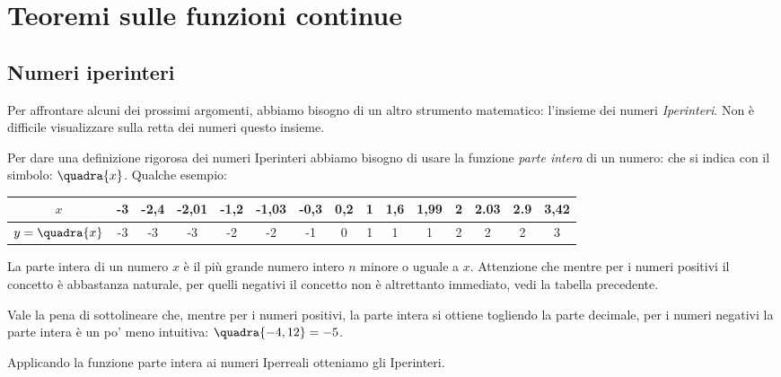 


\chapter{Teoremi sulle funzioni continue}

\section{Numeri iperinteri}
\label{subsec:cont_iperinteri}

Per affrontare alcuni dei prossimi argomenti, abbiamo bisogno di un altro 
strumento matematico: l'insieme dei numeri \emph{Iperinteri}.
Non è difficile visualizzare sulla retta dei numeri questo insieme.

Per dare una definizione rigorosa dei numeri Iperinteri abbiamo bisogno di 
usare la funzione \emph{parte intera} di un numero: che si indica con il 
simbolo:
\(\quadra{x}\). Qualche esempio:
\begin{center}
\begin{tabular}{ccccccccccccccc}
\(x\) & 
-3&-2,4&-2,01&-1,2&-1,03&-0,3&0,2&1&1,6&1,99&2&2.03&2.9&3,42\\
\hline
\(y=\quadra{x}\) & 
-3&-3  &-3   &-2  &-2   &-1  &0  &1&1  &1   &2&2   &2  &3
\end{tabular}
\end{center}

\begin{minipage}{.59\textwidth}
La parte intera di un numero \(x\) è il più grande numero intero \(n\) 
minore o uguale a \(x\). Attenzione che mentre per i numeri positivi il 
concetto è abbastanza naturale, per quelli negativi il concetto non è 
altrettanto immediato, vedi la tabella precedente.

Vale la pena di sottolineare che, mentre per i numeri positivi, la parte 
intera si ottiene togliendo la parte decimale, per i numeri negativi la 
parte intera è un po' meno intuitiva: \(\quadra{-4,12}=-5\).
\end{minipage}
\hfill
\begin{minipage}{.39\textwidth}
\begin{center}
\parteintera
\end{center}
\end{minipage}

Applicando la funzione parte intera ai numeri Iperreali otteniamo gli 
Iperinteri.

